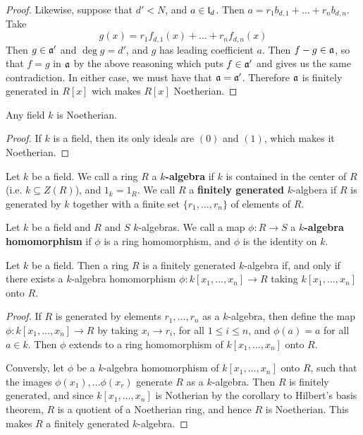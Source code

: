 \begin{proof}
  Likewise, suppose that $d'<N$, and  $a \in \mathfrak{l}_d$. Then
  $a=r_1b_{d,1}+\dots+r_nb_{d,n}$. Take
  \begin{equation*}
    g(x)=r_1f_{d,1}(x)+\dots+r_nf_{d,n}(x)
  \end{equation*}
  Then $g \in \mathfrak{a}'$ and $\deg{g}=d'$, and $g$ has leading coefficient
  $a$. Then $f-g \in \mathfrak{a}$, so that $f=g$ in $\mathfrak{a}$ by the above
  reasoning which puts  $f \in \mathfrak{a}'$ and gives us the same
  contradiction. In either case, we must have that $\mathfrak{a}=\mathfrak{a}'$.
  Therefore $\mathfrak{a}$ is finitely generated in $R[x]$ wich makes $R[x]$
  Noetherian.
\end{proof}
\begin{corollary}
  Any field $k$ is Noetherian.
\end{corollary}
\begin{proof}
If $k$ is a field, then its only ideals are $(0)$ and $(1)$, which makes
it Noetherian.
\end{proof}

\begin{definition}
  Let $k$ be a field. We call a ring  $R$ a \textbf{$k$-algebra} if $k$ is
  contained in the center of  $R$  (i.e. $k \subseteq Z(R)$), and $1_k=1_R$.
  We call  $R$ a  \textbf{finitely generated} $k$-algbera if $R$ is generated
  by  $k$ together with a finite set $\{r_1, \dots, r_n\}$ of elements of
  $R$.
\end{definition}

\begin{definition}
  Let $k$ be a field and $R$ and $S$ $k$-algebras. We call a map  $\phi:R
  \xrightarrow{} S$ a \textbf{$k$-algebra homomorphism} if $\phi$ is a ring
  homomorphism, and  $\phi$ is the identity on $k$.
\end{definition}

\begin{proposition}\label{5.9.4}
  Let $k$ be a field. Then a ring $R$ is a finitely generated $k$-algebra if,
  and only if there exists a $k$-algebra homomorphism $\phi:k[x_1, \dots,
  x_n] \xrightarrow{} R$ taking $k[x_1, \dots, x_n]$ onto $R$.
\end{proposition}
\begin{proof}
  If $R$ is generated by elements  $r_1, \dots, r_n$ as a $k$-algebra, then
  define the map $\phi:k[x_1, \dots, x_n] \xrightarrow{} R$ by taking $x_i
  \xrightarrow{} r_i$, for all $1 \leq i \leq n$, and  $\phi(a)=a$ for all $a
  \in k$. Then  $\phi$ extends to a ring homomorphism of  $k[x_1, \dots,
  x_n]$ onto $R$.

  Conversly, let  $\phi$ be a $k$-algebra homomorphism of $k[x_1, \dots,
  x_n]$ onto $R$,  such that the images $\phi(x_1), \dots \phi(x_r)$ generate
  $R$ as a  $k$-algebra. Then $R$ is finitely generated, and since  $k[x_1,
  \dots, x_n]$ is Notherian by the corollary to Hilbert's basis theorem, $R$
  is a quotient of a Noetherian ring, and hence  $R$ is Noetherian. This
  makes  $R$ a finitely generated  $k$-algebra.
\end{proof}

